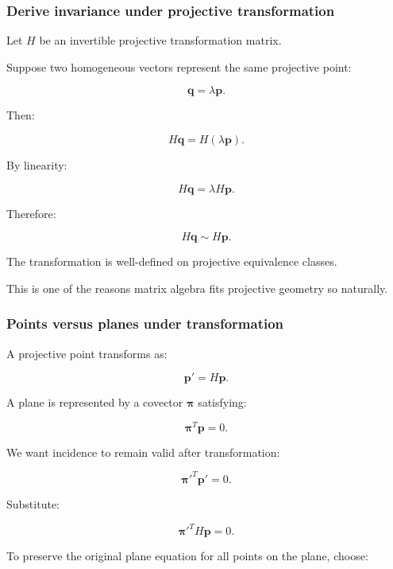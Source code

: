 \subsubsection{Derive invariance under projective transformation}\label{02-foundations-ii-ch032-derive-invariance-under-projective-transformation}

\hypertarget{02-foundations-ii-ch032-derive-invariance-under-projective-transformation}{}

Let \(H\) be an invertible projective transformation matrix.

Suppose two homogeneous vectors represent the same projective point:

\[
 \mathbf q=\lambda\mathbf p.
\]

Then:

\[
 H\mathbf q=H(\lambda\mathbf p).
\]

By linearity:

\[
 H\mathbf q=\lambda H\mathbf p.
\]

Therefore:

\[
 \boxed{ H\mathbf q\sim H\mathbf p }.
\]

The transformation is well-defined on projective equivalence classes.

This is one of the reasons matrix algebra fits projective geometry so naturally.

\subsubsection{Points versus planes under transformation}\label{02-foundations-ii-ch032-points-versus-planes-under-transformation}

\hypertarget{02-foundations-ii-ch032-points-versus-planes-under-transformation}{}

A projective point transforms as:

\[
 \boxed{ \mathbf p'=H\mathbf p }.
\]

A plane is represented by a covector \(\boldsymbol\pi\) satisfying:

\[
 \boldsymbol\pi^T\mathbf p=0.
\]

We want incidence to remain valid after transformation:

\[
 \boldsymbol\pi'^T\mathbf p'=0.
\]

Substitute:

\[
 \boldsymbol\pi'^TH\mathbf p=0.
\]

To preserve the original plane equation for all points on the plane, choose:

